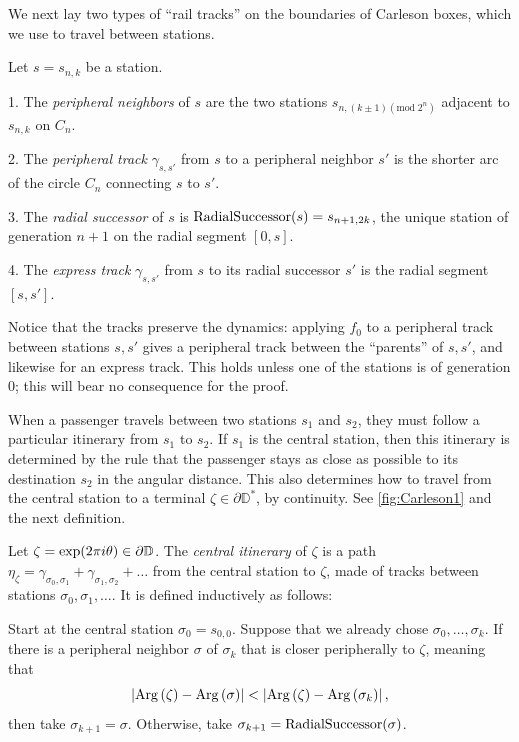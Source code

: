 We next lay two types of \enquote{rail tracks} on the boundaries of Carleson boxes, which we use to travel between stations.

\begin{definition}
Let $s=s_{n,k}$ be a station.

1. The \emph{peripheral neighbors} of $s$ are the two stations $s_{n,\left(k\pm1\right) (\mathrm{mod}\; 2^{n})}$ adjacent to $s_{n,k}$ on $C_{n}$.

2. The \emph{peripheral track }$\gamma_{s,s'}$ from $s$ to a peripheral neighbor $s'$
is the shorter arc of the circle $C_{n}$ connecting $s$ to $s'$.

3. The \emph{radial successor} of $s$ is $\operatorname{RadialSuccessor}(s)=s_{n+1,2k}$, the unique station of generation $n+1$ on the radial segment $[0,s]$.

4. The \emph{express track} $\gamma_{s,s'}$ from $s$ to its radial successor $s'$ is the radial segment $[s,s']$.
\end{definition}

Notice that the tracks preserve the dynamics: applying $f_0$ to a peripheral track between stations $s,s'$ gives a peripheral track between the \enquote{parents} of $s,s'$, and likewise for an express track. This holds unless one of the stations is of generation $0$; this will bear no consequence for the proof.

When a passenger travels between two stations $s_1$ and $s_2$, they must follow a particular itinerary from $s_1$ to $s_2$.
If $s_1$ is the central station, then this itinerary is determined by the rule that the passenger stays as close as possible to its destination $s_2$ in the angular distance.
This also determines how to travel from the central station to a terminal $\zeta\in \partial \mathbb D^*$, by continuity. See \cref{fig:Carleson1} and the next definition.


\begin{definition}
Let $\zeta=\exp(2\pi i\theta)\in\partial\mathbb{D}$. The \emph{central itinerary} of $\zeta$ is a path $\eta_\zeta = \gamma _{\sigma_0,\sigma_1} + \gamma_{\sigma_1,\sigma_2}+\ldots$ from the central station to $\zeta$, made of tracks between stations $\sigma_0,\sigma_1,\ldots$. It is defined inductively as follows:

Start at the central station $\sigma_0=s_{0,0}$. Suppose that we already chose $\sigma_0,\ldots,\sigma_k$. If there is a peripheral neighbor $\sigma$ of $\sigma_k$ that is closer peripherally to $\zeta$, meaning that
$$
\left|\operatorname{Arg}\left(\zeta\right)-\operatorname{Arg}\left(\sigma\right)\right|
< \left|\operatorname{Arg}\left(\zeta\right)-\operatorname{Arg}\left(\sigma_{k}\right)\right|,
$$
then take $\sigma_{k+1}=\sigma$. Otherwise, take $\sigma_{k+1}=\operatorname{RadialSuccessor}(\sigma)$.
\end{definition}

